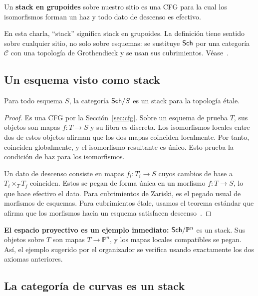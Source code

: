 \documentclass[12pt,openany]{memoir}
\begin{document}
\begin{Def}
Un \textbf{stack en grupoides} sobre nuestro sitio es una CFG para la cual
los isomorfismos forman un haz y todo dato de descenso es efectivo.
\end{Def}

En esta charla, ``stack'' significa stack en grupoides. La definición tiene
sentido sobre cualquier sitio, no solo sobre esquemas: se sustituye
\(\mathsf{Sch}\) por una categoría \(\mathcal C\) con una topología de
Grothendieck y se usan sus cubrimientos. Véase~\cite{sp:stack}.

\subsection{Un esquema visto como stack}
\label{sec:scheme-stack}

\begin{Prop}
Para todo esquema \(S\), la categoría \(\mathsf{Sch}/S\) es un stack para la
topología \'etale.
\end{Prop}

\begin{proof}
Es una CFG por la Sección~\ref{sec:cfg}. Sobre un esquema de prueba \(T\),
sus objetos son mapas \(f:T\to S\) y su fibra es discreta.
Los isomorfismos locales entre dos de estos objetos afirman que los dos
mapas coinciden localmente. Por tanto, coinciden globalmente, y el
isomorfismo resultante es único. Esto prueba la condición de haz para los
isomorfismos.

Un dato de descenso consiste en mapas \(f_i:T_i\to S\) cuyos cambios de
base a \(T_i\times_T T_j\) coinciden. Estos se pegan de forma única
en un morfismo \(f:T\to S\), lo que hace efectivo el dato.
Para cubrimientos de Zariski, es el pegado usual de morfismos de esquemas.
Para cubrimientos \'etale, usamos el teorema estándar que afirma que los
morfismos hacia un esquema satisfacen descenso~\cite{sp:morphism-descent}.
\end{proof}

\textbf{El espacio proyectivo es un ejemplo inmediato:}
\(\mathsf{Sch}/\mathbb P^n\) es un stack. Sus objetos sobre \(T\) son mapas
\(T\to\mathbb P^n\), y los mapas locales compatibles se pegan.
Así, el ejemplo sugerido por el organizador se verifica usando exactamente
los dos axiomas anteriores.

\subsection{La categoría de curvas es un stack}
\end{document}
